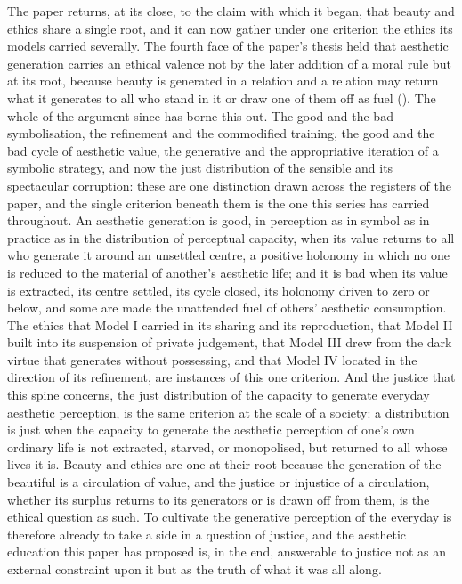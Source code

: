 The paper returns, at its close, to the claim with which it began, that beauty and ethics share a single root, and it can now gather under one criterion the ethics its models carried severally. The fourth face of the paper's thesis held that aesthetic generation carries an ethical valence not by the later addition of a moral rule but at its root, because beauty is generated in a relation and a relation may return what it generates to all who stand in it or draw one of them off as fuel (). The whole of the argument since has borne this out. The good and the bad symbolisation, the refinement and the commodified training, the good and the bad cycle of aesthetic value, the generative and the appropriative iteration of a symbolic strategy, and now the just distribution of the sensible and its spectacular corruption: these are one distinction drawn across the registers of the paper, and the single criterion beneath them is the one this series has carried throughout. An aesthetic generation is good, in perception as in symbol as in practice as in the distribution of perceptual capacity, when its value returns to all who generate it around an unsettled centre, a positive holonomy in which no one is reduced to the material of another's aesthetic life; and it is bad when its value is extracted, its centre settled, its cycle closed, its holonomy driven to zero or below, and some are made the unattended fuel of others' aesthetic consumption. The ethics that Model I carried in its sharing and its reproduction, that Model II built into its suspension of private judgement, that Model III drew from the dark virtue that generates without possessing, and that Model IV located in the direction of its refinement, are instances of this one criterion. And the justice that this spine concerns, the just distribution of the capacity to generate everyday aesthetic perception, is the same criterion at the scale of a society: a distribution is just when the capacity to generate the aesthetic perception of one's own ordinary life is not extracted, starved, or monopolised, but returned to all whose lives it is. Beauty and ethics are one at their root because the generation of the beautiful is a circulation of value, and the justice or injustice of a circulation, whether its surplus returns to its generators or is drawn off from them, is the ethical question as such. To cultivate the generative perception of the everyday is therefore already to take a side in a question of justice, and the aesthetic education this paper has proposed is, in the end, answerable to justice not as an external constraint upon it but as the truth of what it was all along.
